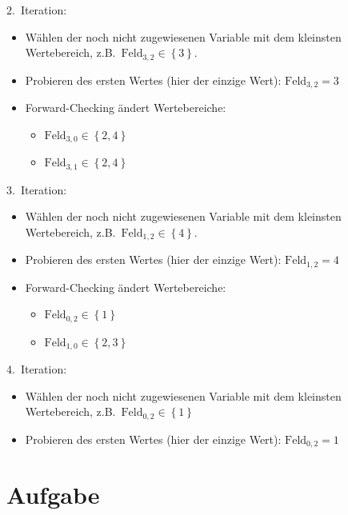 \documentclass[a4paper,draft=false,oneside,12pt,ngerman]{scrreprt}
\begin{document}
2.\ Iteration:

\begin{itemize}
    \item Wählen der noch nicht zugewiesenen Variable mit dem kleinsten
        Wertebereich, z.B.\ $ \text{Feld}_{3,2} \in \left\{ 3 \right\} $.
    \item Probieren des ersten Wertes (hier der einzige Wert): $
        \text{Feld}_{3,2} = 3 $
    \item Forward-Checking ändert Wertebereiche:
        \begin{itemize}
            \item $ \text{Feld}_{3,0} \in \left\{ 2, 4 \right\} $
            \item $ \text{Feld}_{3,1} \in \left\{ 2, 4 \right\} $
        \end{itemize}
\end{itemize}

3.\ Iteration:

\begin{itemize}
    \item Wählen der noch nicht zugewiesenen Variable mit dem kleinsten
        Wertebereich, z.B.\ $ \text{Feld}_{1,2} \in \left\{ 4 \right\} $.
    \item Probieren des ersten Wertes (hier der einzige Wert): $
        \text{Feld}_{1,2} = 4 $
    \item Forward-Checking ändert Wertebereiche:
        \begin{itemize}
            \item $ \text{Feld}_{0,2} \in \left\{ 1 \right\} $
            \item $ \text{Feld}_{1,0} \in \left\{ 2, 3 \right\} $
        \end{itemize}
\end{itemize}

4.\ Iteration:

\begin{itemize}
    \item Wählen der noch nicht zugewiesenen Variable mit dem kleinsten
        Wertebereich, z.B.\ $ \text{Feld}_{0,2} \in \left\{ 1 \right\} $
    \item Probieren des ersten Wertes (hier der einzige Wert): $
        \text{Feld}_{0,2} = 1 $
\end{itemize}

\chapter{Aufgabe}
\label{chp:aufgabe4}
\end{document}

